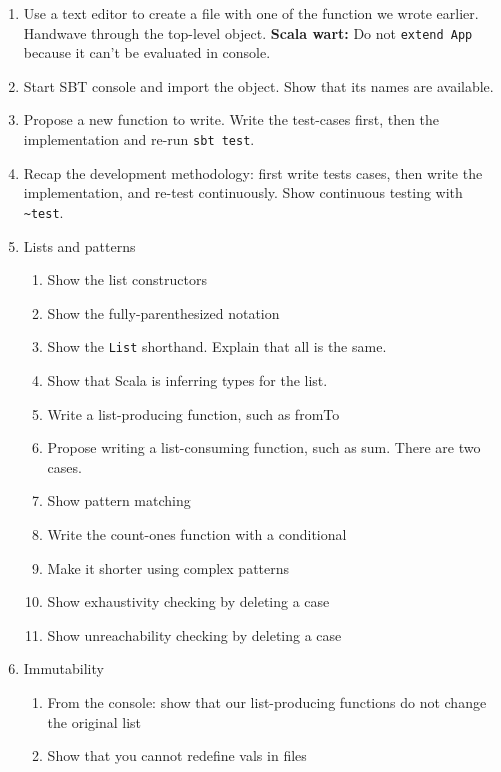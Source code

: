 \documentclass[9pt]{extbook}
\begin{document}
\begin{enumerate}
\item Use a text editor to create a file with one of the function
we wrote earlier. Handwave through the top-level object.
 \textbf{Scala wart:} Do not \verb|extend App| because it can't be evaluated in console.

\item Start SBT console and import the object. Show that its names
are available.

\item Propose a new function to write. Write the test-cases first, then
the implementation and re-run \verb|sbt test|.

\item Recap the development methodology: first write tests cases, then
write the implementation, and re-test continuously. Show continuous
testing with \verb|~test|.

\item Lists and patterns

\begin{enumerate}

  \item Show the list constructors
  \item Show the fully-parenthesized notation
  \item Show the \lstinline|List| shorthand. Explain that all is the same.
  \item Show that Scala is inferring types for the list.
  \item Write a list-producing function, such as fromTo
  \item Propose writing a list-consuming function, such as sum. There are two cases.
  \item Show pattern matching
  \item Write the count-ones function with a conditional
  \item Make it shorter using complex patterns
  \item Show exhaustivity checking by deleting a case
  \item Show unreachability checking by deleting a case

\end{enumerate}

\item Immutability

\begin{enumerate}

  \item From the console: show that our list-producing functions do not
  change the original list

  \item Show that you cannot redefine vals in files

\end{enumerate}
\end{enumerate}
\end{document}

